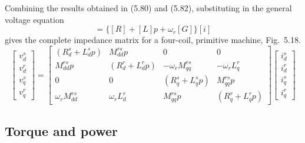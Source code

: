 \documentclass[a4paper,numbers=noenddot,12pt]{scrbook}
\begin{document}
        Combining the results obtained in (5.80) and (5.82), substituting in the general voltage equation
        \begin{equation*}
            [v] = \{[R] + [L]p+\omega_r[G]\}[i]
        \end{equation*}
        gives the complete impedance matrix for a four-coil, primitive machine, Fig.\ 5.18.
        \begin{equation}
            \begin{bmatrix}
                v_d^s \\ v_d^r \\ v_q^s \\ v_q^r
            \end{bmatrix}
            =
            \begin{bmatrix}
                (R_d^s + L_d^s p) & M_{dd}^{rs}p & 0 & 0\\
                M_{dd}^{rs}p & (R_d^r + L_d^r p) & -\omega_r M_{qq}^{rs} &-\omega_r L_q^r \\
                0 & 0 & (R_q^s + L_q^s p) & M_{qq}^{rs} p \\
                \omega_r M_{dd}^{rs} & \omega_r L_{d}^{r} & M_{qq}^{rs} p & (R_q^r + L_q^r p)
            \end{bmatrix}
            \begin{bmatrix}
                i_d^s \\ i_d^r \\ i_q^s \\ i_q^r
            \end{bmatrix}
        \end{equation}
        \subsection{Torque and power}
\end{document}

